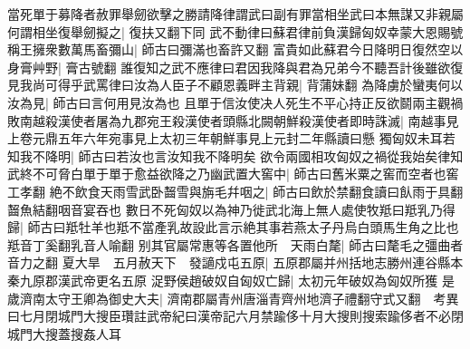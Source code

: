 當死單于募降者赦罪舉劒欲擊之勝請降律謂武曰副有罪當相坐武曰本無謀又非親屬何謂相坐復舉劒擬之|{
	復扶又翻下同}
武不動律曰蘇君律前負漢歸匈奴幸蒙大恩賜號稱王擁衆數萬馬畜彌山|{
	師古曰彌滿也畜許又翻}
富貴如此蘇君今日降明日復然空以身膏艸野|{
	膏古號翻}
誰復知之武不應律曰君因我降與君為兄弟今不聽吾計後雖欲復見我尚可得乎武罵律曰汝為人臣子不顧恩義畔主背親|{
	背蒲妹翻}
為降虜於蠻夷何以汝為見|{
	師古曰言何用見汝為也}
且單于信汝使决人死生不平心持正反欲鬬兩主觀禍敗南越殺漢使者屠為九郡宛王殺漢使者頭縣北闕朝鮮殺漢使者即時誅滅|{
	南越事見上卷元鼎五年六年宛事見上太初三年朝鮮事見上元封二年縣讀曰懸}
獨匈奴未耳若知我不降明|{
	師古曰若汝也言汝知我不降明矣}
欲令兩國相攻匈奴之禍從我始矣律知武終不可脅白單于單于愈益欲降之乃幽武置大窖中|{
	師古曰舊米粟之窖而空者也窖工孝翻}
絶不飲食天雨雪武卧齧雪與旃毛幷咽之|{
	師古曰飲於禁翻食讀曰飤雨于具翻齧魚結翻咽音宴吞也}
數日不死匈奴以為神乃徙武北海上無人處使牧羝曰羝乳乃得歸|{
	師古曰羝牡羊也羝不當產乳故設此言示絶其事若燕太子丹烏白頭馬生角之比也羝音丁奚翻乳音人喻翻}
别其官屬常惠等各置他所　天雨白氂|{
	師古曰氂毛之彊曲者音力之翻}
夏大旱　五月赦天下　發讁戍屯五原|{
	五原郡屬并州括地志勝州連谷縣本秦九原郡漢武帝更名五原}
浞野侯趙破奴自匈奴亡歸|{
	太初元年破奴為匈奴所獲}
是歲濟南太守王卿為御史大夫|{
	濟南郡屬青州唐淄青齊州地濟子禮翻守式又翻　考異曰七月閉城門大搜臣瓚註武帝紀曰漢帝記六月禁踰侈十月大搜則搜索踰侈者不必閉城門大搜蓋搜姦人耳}



